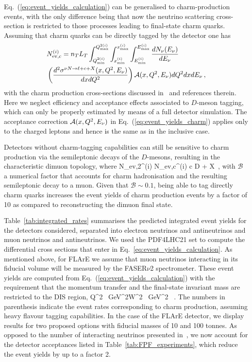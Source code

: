 Eq.~(\ref{eq:event_yields_calculation}) can be generalised to charm-production events, with
the only difference being that now the neutrino scattering cross-section is restricted
to those processes leading to final-state charm quarks.
%
Assuming that charm quarks can be directly tagged by the detector one has
\begin{align}
	\label{eq:event_yields_charm}
	&N_{\rm ev,c}^{(i)} = n_T L_T\int_{Q^{2(i)}_{\rm min}}^{Q^{2(i)}_{\rm max}}\int_{x^{(i)}_{\rm min}}^{x^{(i)}_{\rm max}}
	\int_{E_{\rm min}^{(i)}}^{E_{\rm max}^{(i)}} \frac{dN_{\nu}(E_\nu)}{dE_{\nu}} \\
	&\left(\frac{d^2\sigma^{\nu N \to \ell + c+X}(x,Q^2,E_{\nu})}{dxdQ^2}\right) {\cal A}(x,Q^2,E_{\nu}) dQ^2 dx dE_{\nu} \, , 
	\nonumber
\end{align}
with the charm production cross-sections discussed in~\cite{Faura:2020oom}
and references therein.
%
Here we neglect efficiency and acceptance effects associated to $D$-meson
tagging, which can only be properly estimated by means
of a full detector simulation.
%
The acceptance correction ${\cal A}(x,Q^2,E_{\nu})$ in Eq.~(\ref{eq:event_yields_charm})
applies only to the charged leptons and hence is the same as in
the inclusive case.

Detectors without charm-tagging capabilities can still be sensitive to charm production via
the semileptonic decays of the $D$-mesons, resulting in the characteristic
dimuon topology, where
\be
 N_{\rm ev,2\mu}^{(i)} \approx N_{\rm ev,c}^{(i)} \times {}\lp c \to D \to \mu + X\rp \, ,
 \ee
 with $\mathcal{B}$ a numerical factor that accounts for charm hadronisation and the
 resulting semileptonic decay to a muon.
 Given that $\mathcal{B}\sim 0.1$, being able to tag directly charm quarks increases the event yields
 of charm production events by a factor of 10 as compared to reconstructing the dimuon final state.

 Table~\ref{tab:integrated_rates} summarises the predicted integrated event yields for the
 detectors
considered, separated into electron neutrinos and antineutrinos
and muon neutrinos and antineutrinos.
%
We used the PDF4LHC21 set to compute the differential cross sections that enter in Eq.~\ref{eq:event_yields_calculation}.
%
As mentioned above, for FLArE we assume that muon neutrinos interacting
in its fiducial volume will be measured
by the FASER$\nu$2 spectrometer.
These event yields are computed from Eq.~(\ref{eq:event_yields_calculation}) with the
requirement that the momentum transfer and the final-state invariant mass are restricted
to the DIS region,
\be
\label{eq:DISconditions}
Q^2 ~{\rm GeV}^2\quad  W^2 ~{\rm GeV}^2 \, .
\ee
%
The numbers in parenthesis indicate the event rates corresponding to charm
production, assuming heavy flavour tagging capabilities.
%
In the case of the FLArE detector, we display results for two proposed options with fiducial
masses of 10 and 100 tonnes.
%
As opposed to the number of interacting neutrinos presented
in~\cite{Feng:2022inv}, we now account for the
detector acceptances listed in  Table~\ref{tab:FPF_experiments}, which reduce
the event yields by up to a factor 2.

